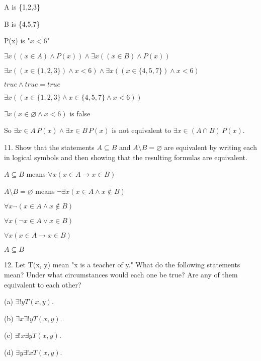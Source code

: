 \documentclass{article}
\begin{document}
A is \{1,2,3\}

B is \{4,5,7\}

P(x) is "$x < 6$"

$\exists x ((x \in A) \land P(x)) \land \exists x ((x \in B) \land P(x))$

$\exists x ((x \in \{1,2,3\}) \land x < 6) \land \exists x ((x \in \{4,5,7\}) \land x < 6)$

$true \land true = true$
\vspace{20pt}

$\exists x ((x \in \{1,2,3\} \land x \in \{4,5,7\} \land x < 6))$

$\exists x (x \in \varnothing \land x < 6)$ is false

So $\exists x \in A \, P(x) \land \exists x \in B \, P(x)$ is not equivalent to $\exists x \in (A \cap B) \, P(x)$.

\vspace{30pt}

11. Show that the statements $A \subseteq B$ and $A \setminus B = \varnothing$ are equivalent by writing
each in logical symbols and then showing that the resulting formulas are equivalent.
\vspace{30pt}

$A \subseteq B$ means $\forall x (x \in A \to x \in B)$

$A \setminus B = \varnothing$ means $\neg \exists x (x \in A \land x \notin B)$

$\forall x \neg (x \in A \land x \notin B)$

$\forall x (\neg x \in A \lor x \in B)$

$\forall x (x \in A \to x \in B)$

$A \subseteq B$

\vspace{30pt}

12. Let T(x, y) mean "x is a teacher of y."
What do the following statements mean?
Under what circumstances would each one be true?
Are any of them equivalent to each other?

\hspace{12pt}(a) $\exists !y T(x, y)$.

\hspace{12pt}(b) $\exists x \exists ! y T(x, y)$.

\hspace{12pt}(c) $\exists ! x \exists y T(x, y)$.

\hspace{12pt}(d) $\exists y \exists ! x T(x, y)$.
\end{document}
